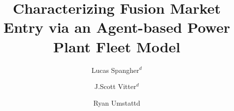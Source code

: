 \documentclass[review]{elsarticle}
\begin{document}
\begin{frontmatter}

\title{Characterizing Fusion Market Entry via an Agent-based Power Plant Fleet Model}


\author[lucas]{Lucas Spangher\corref{}$^d$}
\author[scott]{J.Scott Vitter$^d$}
\author[ryan]{Ryan Umstattd}
\address[lucas]{Corresponding author.  U.S. Department of Energy Advanced Research Projects Agency -- Energy (ARPA-E), e-mail: \url{lucas_spangher@berkeley.edu}, fax: +1 (510) 643-7846. Currently at the University of California, Berkeley.}
\address[scott]{The University of Texas at Austin, e-mail: \url{scott.vitter@utexas.edu.}}
\address[ryan]{U.S. Department of Energy Advanced Research Projects Agency -- Energy (ARPA-E), \url{Ryan.Umstattd@hq.doe.gov}}
\address[lucas, scott]{These two authors are co-first authors.}

\end{frontmatter}
\end{document}
